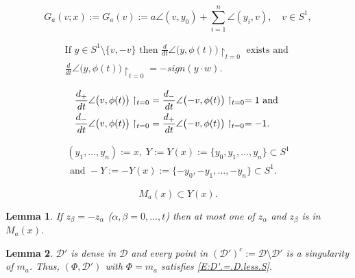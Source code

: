 \documentclass[10pt,a4paper]{amsart}
\newtheorem{lemma}{Lemma}
\newcommand{\D}{\mathcal{D}}
\begin{document}
	\begin{equation}  \label{E:Ga.defn}
		G_{a}(v; x) := G_{a}(v) := a \angle(v, y_{0}) +  \sum_{i=1}^{n} \angle (y_{i}, v),  
		            \quad v \in S^{1},
	\end{equation}

	\begin{multline}  \label{E:angle.deriv.sign}
		\text{If } y \in S^{1} \setminus \{ v, -v \} \text{ then } 
		  \frac{d}{dt} \angle \bigl( y,\phi(t) \bigr) \restriction_{t=0} \text{ exists and } \\
		    \frac{d}{dt} \angle \bigl( y,\phi(t) \bigr) \restriction_{t=0} = -sign(y \cdot w).
	\end{multline}  

    \begin{align} \label{E:one-sided.angle.derivs}
      \frac{d_{+}}{dt} \angle \bigl( v,\phi(t) \bigr) \restriction_{t=0} 
        &= \frac{d_{-}}{dt} \angle \bigl( -v,\phi(t) \bigr) \restriction_{t=0} = 1 \text{ and } \\
      \frac{d_{-}}{dt} \angle \bigl( v,\phi(t) \bigr) \restriction_{t=0} 
        &= \frac{d_{+}}{dt} \angle \bigl( -v,\phi(t) \bigr) \restriction_{t=0} = -1 . \notag
    \end{align}

	\begin{multline} \label{E:Y(x).defn}
	     (y_{1}, \ldots, y _{n}) := x, \;
		  Y := Y(x)  := \{ y_{0}, y_{1}, \ldots, y_{n} \} \subset S^{1} \\
		           \text{ and } - Y := -Y(x) := \{ -y_{0}, -y_{1}, \ldots, -y_{n} \} \subset S^{1}.
	\end{multline}

	\begin{equation} \label{E:Ma(x).in.Y}
		M_{a}(x) \subset Y(x).
	\end{equation}

  \begin{lemma} \label{L:not.both.antipodals.in.Ma}
If $z_{\beta} = -z_{\alpha}$ ($\alpha, \beta = 0, \ldots, t$) then at most 
one of $z_{\alpha} $ and $z_{\beta}$ is in $M_{a}(x)$.
  \end{lemma}

  \begin{lemma} \label{L:D'.is.dense.for.aug.median}
$\D'$ is dense in $\D$ and every point in $(\D')^{c} := \D \setminus \D'$ is a singularity of $m_{a}$. Thus, $(\Phi, \D')$ with $\Phi = m_{a}$ satisfies \eqref{E:D'.=.D.less.S}.
  \end{lemma}
\end{document}
